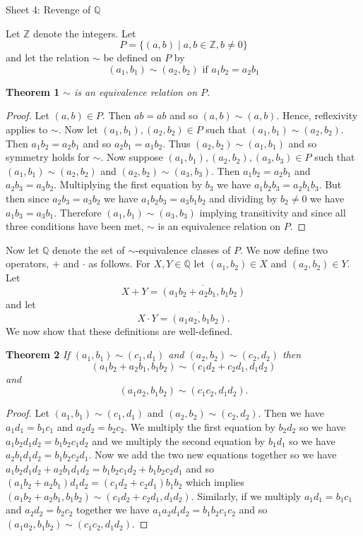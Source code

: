 \documentclass{article}
\begin{document}
\begin{flushleft}

\Large

Sheet 4: Revenge of $\mathbb{Q}$\newline

\normalsize

Let $\mathbb{Z}$ denote the integers. Let
\[
P = \{(a,b) \mid a,b \in \mathbb{Z}, b \neq 0\}
\]
and let the relation $\sim$ be defined on $P$ by
\[
(a_1,b_1) \sim (a_2,b_2) \text{ if } a_1b_2=a_2b_1
\]

\textbf{Theorem 1}
\textsl{$\sim$ is an equivalence relation on $P$.}
\begin{proof}
Let $(a,b) \in P$. Then $ab=ab$ and so $(a,b) \sim (a,b)$. Hence, reflexivity applies to $\sim$. Now let $(a_1,b_1), (a_2,b_2) \in P$ such that $(a_1,b_1) \sim (a_2,b_2)$. Then $a_1b_2=a_2b_1$ and so $a_2b_1=a_1b_2$. Thus $(a_2,b_2) \sim (a_1,b_1)$ and so symmetry holds for $\sim$. Now suppose $(a_1,b_1), (a_2,b_2), (a_3,b_3) \in P$ such that $(a_1,b_1) \sim (a_2,b_2)$ and $(a_2,b_2) \sim (a_3,b_3)$. Then $a_1b_2=a_2b_1$ and $a_2b_3=a_3b_2$. Multiplying the first equation by $b_3$ we have $a_1b_2b_3=a_2b_1b_3$. But then since $a_2b_3=a_3b_2$ we have $a_1b_2b_3=a_3b_1b_2$ and dividing by $b_2 \neq 0$ we have $a_1b_3=a_3b_1$. Therefore $(a_1,b_1) \sim (a_3,b_3)$ implying transitivity and since all three conditions have been met, $\sim$ is an equivalence relation on $P$.
\end{proof}

Now let $\mathbb{Q}$ denote the set of $\sim$-equivalence classes of $P$. We now define two operators, $+$ and $\cdot$ as follows. For $X,Y \in \mathbb{Q}$ let $(a_1,b_2) \in X$ and $(a_2,b_2) \in Y$. Let
\[
X + Y = \overline{(a_1b_2 + a_2b_1,b_1b_2)}
\]
and let
\[
X \cdot Y = \overline{(a_1a_2,b_1b_2)}.
\]
We now show that these definitions are well-defined.\newline

\textbf{Theorem 2}
\textsl{If $(a_1,b_1) \sim (c_1,d_1)$ and $(a_2,b_2) \sim (c_2,d_2)$ then
\[
(a_1b_2+a_2b_1,b_1b_2) \sim (c_1d_2+c_2d_1,d_1d_2)
\]
and
\[
(a_1a_2,b_1b_2) \sim (c_1c_2,d_1d_2).
\]}
\begin{proof}
Let $(a_1,b_1) \sim (c_1,d_1)$ and $(a_2,b_2) \sim (c_2,d_2)$. Then we have $a_1d_1=b_1c_1$ and $a_2d_2=b_2c_2$. We multiply the first equation by $b_2d_2$ so we have $a_1b_2d_1d_2 = b_1b_2c_1d_2$ and we multiply the second equation by $b_1d_1$ so we have $a_2b_1d_1d_2 = b_1b_2c_2d_1$. Now we add the two new equations together so we have $a_1b_2d_1d_2 + a_2b_1d_1d_2 = b_1b_2c_1d_2 + b_1b_2c_2d_1$ and so $(a_1b_2+a_2b_1)d_1d_2 = (c_1d_2 + c_2d_1)b_1b_2$ which implies $(a_1b_2+a_2b_1,b_1b_2) \sim (c_1d_2+c_2d_1,d_1d_2)$. Similarly, if we multiply $a_1d_1=b_1c_1$ and $a_2d_2=b_2c_2$ together we have $a_1a_2d_1d_2=b_1b_2c_1c_2$ and so $(a_1a_2,b_1b_2) \sim (c_1c_2,d_1d_2)$.
\end{proof}


\end{flushleft}
\end{document}
